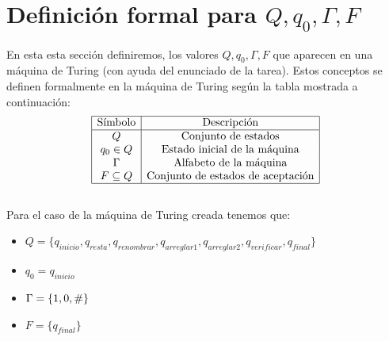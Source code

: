 \documentclass[12pt]{article}
\begin{document}
\section*{Definición formal para $Q, q_{0}, \Gamma, F$}
En esta esta sección definiremos, los valores $Q, q_{0}, \Gamma, F$ que aparecen en una máquina de Turing (con ayuda del enunciado de la tarea). Estos conceptos se definen formalmente en la máquina de Turing según la tabla mostrada a continuación:
    \[
    \begin{array}{|c|c|}
    \hline
         \text{Símbolo} & \text{Descripción}  \\ \hline
         \text{$Q$} & \text{Conjunto de estados} \\
         \text{$q_{0} \in Q$} & \text{Estado inicial de la máquina}\\
         \text{$\Gamma$} & \text{Alfabeto de la máquina} \\
         \text{$F \subseteq Q$} & \text{Conjunto de estados de aceptación} \\
         \hline
    \end{array}
    \]\\
    Para el caso de la máquina de Turing creada tenemos que:
    \begin{itemize}
        \item $Q = \{q_{inicio}, q_{resta}, q_{renombrar}, q_{arreglar1}, q_{arreglar2}, q_{verificar}, q_{final}\}$
        \item $q_{0} = q_{inicio}$
        \item $\Gamma = \{1 , 0, \text\# \} $
        \item $F = \{ q_{final} \}$ 
    \end{itemize}
    
\end{document}
